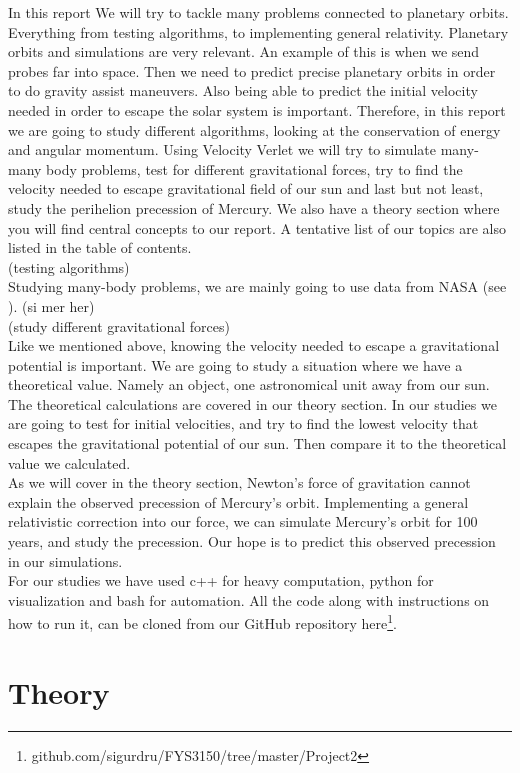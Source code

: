 \documentclass[reprint, english,notitlepage,nofootinbib]{revtex4-1}  %
\begin{document}
In this report We will try to tackle many problems connected to planetary orbits. Everything from testing algorithms, to implementing general relativity. Planetary orbits and simulations are very relevant. An example of this is when we send probes far into space. Then we need to predict precise planetary orbits in order to do gravity assist maneuvers. Also being able to predict the initial velocity needed in order to escape the solar system is important. Therefore, in this report we are going to study different algorithms, looking at the conservation of energy and angular momentum. Using Velocity Verlet we will try to simulate many-many body problems, test for different gravitational forces, try to find the velocity needed to escape gravitational field of our sun and last but not least, study the perihelion precession of Mercury. We also have a theory section where you will find central concepts to our report. A tentative list of our topics are also listed in the table of contents.
\\
(testing algorithms)
\\
Studying many-body problems, we are mainly going to use data from NASA (see \citep{NASA}). (si mer her)
\\
(study different gravitational forces)
\\
Like we mentioned above, knowing the velocity needed to escape a gravitational potential is important. We are going to study a situation where we have a theoretical value. Namely an object, one astronomical unit away from our sun. The theoretical calculations are covered in our theory section. In our studies we are going to test for initial velocities, and try to find the lowest velocity that escapes the gravitational potential of our sun. Then compare it to the theoretical value we calculated.
\\
As we will cover in the theory section, Newton's force of gravitation cannot explain the observed precession of Mercury's orbit. Implementing a general relativistic correction into our force, we can simulate Mercury's orbit for 100 years, and study the precession. Our hope is to predict this observed precession in our simulations.
\\
For our studies we have used c++ for heavy computation, python for visualization and bash for automation. All the code along with instructions on how to run it, can be cloned from our GitHub repository here\footnote{github.com/sigurdru/FYS3150/tree/master/Project2}.

\section{Theory}
\end{document}

